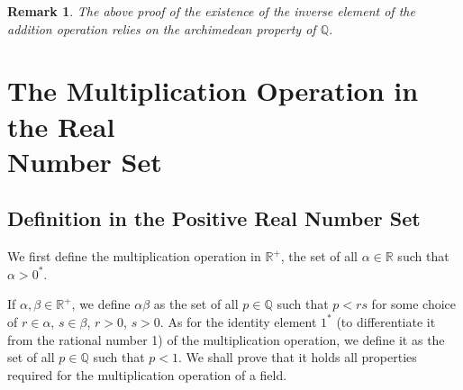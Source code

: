 \documentclass[onecolumn]{article}
\newtheorem{remark}{Remark}[section]
\begin{document}
\begin{remark}
  The above proof of the existence of the inverse element of the addition 
  operation relies on the archimedean property of $\mathbb{Q}$.
\end{remark}

\section{The Multiplication Operation in the Real \\ Number Set}

\subsection{Definition in the Positive Real Number Set}

We first define the multiplication operation in $\mathbb{R^+}$, the set of all 
$\alpha \in \mathbb{R}$ such that $\alpha > 0^*$.

If $\alpha, \beta \in \mathbb{R^+}$, we define $\alpha \beta$ as the set of 
all $p \in \mathbb{Q}$ such that $p < rs$ for some choice of $r \in \alpha$, 
$s \in \beta$, $r > 0$, $s > 0$. As for the identity element $1^*$ (to 
differentiate it from the rational number 1) of the multiplication operation, we 
define it as the set of all $p \in \mathbb{Q}$ such that $p < 1$. We shall prove 
that it holds all properties required for the multiplication operation of a 
field.
\end{document}
